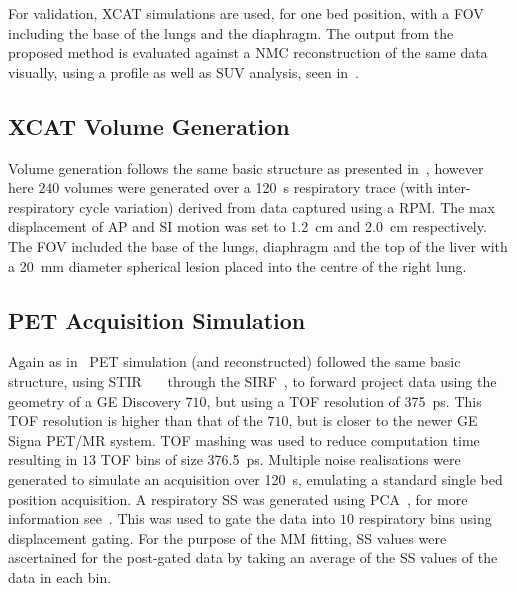             For validation, \gls{XCAT} simulations are used, for one bed position, with a \gls{FOV} including the base of the lungs and the diaphragm. The output from the proposed method is evaluated against a \gls{NMC} reconstruction of the same data visually, using a profile as well as \gls{SUV} analysis, seen in~.
            
            \subsection{XCAT Volume Generation} \label{sec:pet_ct_respiratory_motion_correction_with_a_single_attenuation_map_using_nac_derived_deformation_fields_methods_xcat_volume_generation}
                Volume generation follows the same basic structure as presented in~, however here $240$ volumes were generated over a \SI{120}{\second} respiratory trace (with inter-respiratory cycle variation) derived from data captured using a \gls{RPM}. The max displacement of \gls{AP} and \gls{SI} motion was set to \SI{1.2}{\centi\metre} and \SI{2.0}{\centi\metre} respectively. The \gls{FOV} included the base of the lungs, diaphragm and the top of the liver with a \SI{20}{\milli\metre} diameter spherical lesion placed into the centre of the right lung.
    
            \subsection{PET Acquisition Simulation} \label{sec:pet_ct_respiratory_motion_correction_with_a_single_attenuation_map_using_nac_derived_deformation_fields_methods_pet_acquisition_simulation}
                Again as in~ \gls{PET} simulation (and reconstructed) followed the same basic structure, using \gls{STIR}~~~ through the \gls{SIRF}~, to forward project data using the geometry of a \gls{GE} Discovery $710$, but using a \gls{TOF} resolution of \SI{375}{\pico\second}. This \gls{TOF} resolution is higher than that of the $710$, but is closer to the newer \gls{GE} Signa \gls{PET}/\gls{MR} system. \gls{TOF} mashing was used to reduce computation time resulting in $13$ \gls{TOF} bins of size \SI{376.5}{\pico\second}. Multiple noise realisations were generated to simulate an acquisition over \SI{120}{\second}, emulating a standard single bed position acquisition. A respiratory \gls{SS} was generated using \gls{PCA}~, for more information see~. This was used to gate the data into $10$ respiratory bins using displacement gating. For the purpose of the \gls{MM} fitting, \gls{SS} values were ascertained for the post-gated data by taking an average of the \gls{SS} values of the data in each bin.
            
